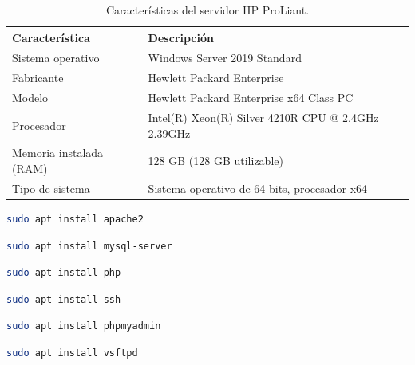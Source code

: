 \begin{table}[htbp]
\begin{center}
\caption{Características del servidor HP ProLiant.}
\begin{tabular}{|l|l|}
\hline
\rowcolor[HTML]{C0C0C0} 
\textbf{Característica} & \textbf{Descripción}\\ \hline
Sistema operativo & Windows Server 2019 Standard\\ \hline
Fabricante & Hewlett Packard Enterprise \\ \hline
Modelo & Hewlett Packard Enterprise x64 Class PC\\ \hline
Procesador & Intel(R) Xeon(R) Silver 4210R CPU @ 2.4GHz 2.39GHz\\ \hline
Memoria instalada (RAM) & 128 GB (128 GB utilizable) \\ \hline
Tipo de sistema & Sistema operativo de 64 bits, procesador x64 \\ \hline
\end{tabular}
\end{center}
\end{table}

\begin{lstlisting}[language=sh, firstnumber=0, basicstyle=\normalsize, caption={Comando para instalar apache2 .}] 
sudo apt install apache2 \end{lstlisting}

\begin{lstlisting}[language=sh, firstnumber=0, basicstyle=\normalsize, caption={Comando para instalar Mysql.}] 
sudo apt install mysql-server \end{lstlisting}

\begin{lstlisting}[language=sh, firstnumber=0, basicstyle=\normalsize, caption={Comando para instalar PHP.}] 
sudo apt install php \end{lstlisting}

\begin{lstlisting}[language=sh, firstnumber=0, basicstyle=\normalsize, caption={Comando para instalar ssh.}] 
sudo apt install ssh \end{lstlisting}

\begin{lstlisting}[language=sh, firstnumber=0, basicstyle=\normalsize, caption={Comando para instalar phpmyadmin.}] 
sudo apt install phpmyadmin \end{lstlisting}

\begin{lstlisting}[language=sh, firstnumber=0, basicstyle=\normalsize, caption={Comando para instalar vsftpd.}] 
sudo apt install vsftpd\end{lstlisting}

